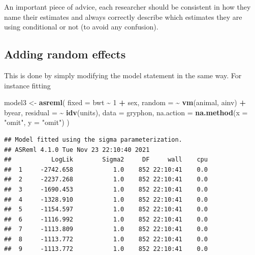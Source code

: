 \documentclass[
  12pt,
]{book}
\newenvironment{Shaded}{\begin{snugshade}}{\end{snugshade}}
\newcommand{\DataTypeTok}[1]{\textcolor[rgb]{0.13,0.29,0.53}{#1}}
\newcommand{\DecValTok}[1]{\textcolor[rgb]{0.00,0.00,0.81}{#1}}
\newcommand{\KeywordTok}[1]{\textcolor[rgb]{0.13,0.29,0.53}{\textbf{#1}}}
\newcommand{\NormalTok}[1]{#1}
\newcommand{\OperatorTok}[1]{\textcolor[rgb]{0.81,0.36,0.00}{\textbf{#1}}}
\newcommand{\StringTok}[1]{\textcolor[rgb]{0.31,0.60,0.02}{#1}}
\begin{document}
An important piece of advice, each researcher should be consistent in how they name their estimates and always correctly describe which estimates they are using conditional or not (to avoid any confusion).

\hypertarget{adding-random-effects}{%
\subsection{Adding random effects}\label{adding-random-effects}}

This is done by simply modifying the model statement in the same way. For instance fitting

\begin{Shaded}
\begin{Highlighting}[]
\NormalTok{model3 \textless{}{-}}\StringTok{ }\KeywordTok{asreml}\NormalTok{(}
  \DataTypeTok{fixed =}\NormalTok{ bwt }\OperatorTok{\textasciitilde{}}\StringTok{ }\DecValTok{1} \OperatorTok{+}\StringTok{ }\NormalTok{sex,}
  \DataTypeTok{random =} \OperatorTok{\textasciitilde{}}\StringTok{ }\KeywordTok{vm}\NormalTok{(animal, ainv) }\OperatorTok{+}\StringTok{ }\NormalTok{byear,}
  \DataTypeTok{residual =} \OperatorTok{\textasciitilde{}}\StringTok{ }\KeywordTok{idv}\NormalTok{(units),}
  \DataTypeTok{data =}\NormalTok{ gryphon,}
  \DataTypeTok{na.action =} \KeywordTok{na.method}\NormalTok{(}\DataTypeTok{x =} \StringTok{"omit"}\NormalTok{, }\DataTypeTok{y =} \StringTok{"omit"}\NormalTok{)}
\NormalTok{)}
\end{Highlighting}
\end{Shaded}

\begin{verbatim}
## Model fitted using the sigma parameterization.
## ASReml 4.1.0 Tue Nov 23 22:10:40 2021
##           LogLik        Sigma2     DF     wall    cpu
##  1     -2742.658           1.0    852 22:10:41    0.0
##  2     -2237.268           1.0    852 22:10:41    0.0
##  3     -1690.453           1.0    852 22:10:41    0.0
##  4     -1328.910           1.0    852 22:10:41    0.0
##  5     -1154.597           1.0    852 22:10:41    0.0
##  6     -1116.992           1.0    852 22:10:41    0.0
##  7     -1113.809           1.0    852 22:10:41    0.0
##  8     -1113.772           1.0    852 22:10:41    0.0
##  9     -1113.772           1.0    852 22:10:41    0.0
\end{verbatim}

\begin{Shaded}
\end{Shaded}
\end{document}
